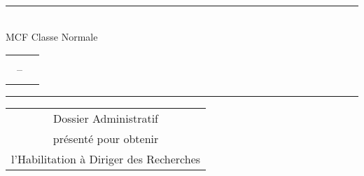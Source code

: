 \noindent\rule{\textwidth}{1pt}
\begin{center}
\textsf
{\huge\textbf{\prenom~\nomusage}}\\[.3cm]
MCF Classe Normale\\[.5cm]
\large{
	\begin{tabular}{c|c}
		\univ & \mailwork\\
		\labo~-- \ufr & \telwork \\
		\adruniv & {\footnotesize \webwork} \\
	\end{tabular}
}
\end{center}
\rule{\textwidth}{1pt}

\vfill

\begin{center}
	\bfseries
	\begin{tabular}{c}
		\huge Dossier Administratif\\[.5cm]
		\huge présenté pour obtenir \\[.5cm]
    \huge l'Habilitation à Diriger des Recherches
	\end{tabular}
\end{center}


\vfill

\begin{center}
	\begin{minipage}{.8\linewidth}
		\renewcommand{\contentsname}{}
    \setcounter{tocdepth}{2}
		{\small \tableofcontents}
	\end{minipage}
\end{center}

\vspace{.3cm}

\vspace{-2.5cm}
\thispagestyle{empty}

